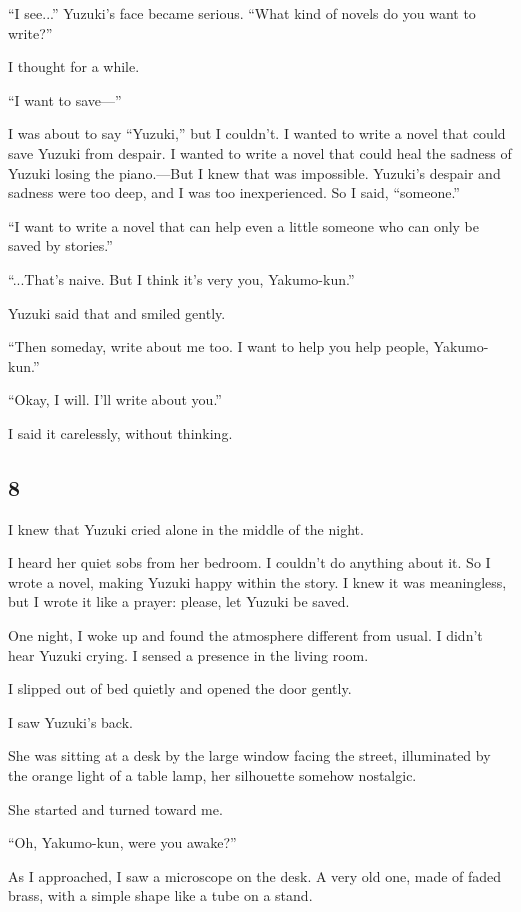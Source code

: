 \documentclass[
    a4paper,
    12pt,
    twoside,
    openany,
    UTF8,
    fontset=windows
]{ctexbook}
\begin{document}
``I see...'' Yuzuki's face became serious. ``What kind of novels do you want to write?''

I thought for a while.

``I want to save---''

I was about to say ``Yuzuki,'' but I couldn't. I wanted to write a novel that could save Yuzuki from despair. I wanted to write a novel that could heal the sadness of Yuzuki losing the piano.---But I knew that was impossible. Yuzuki's despair and sadness were too deep, and I was too inexperienced. So I said, ``someone.''

``I want to write a novel that can help even a little someone who can only be saved by stories.''

``...That's naive. But I think it's very you, Yakumo-kun.''

Yuzuki said that and smiled gently.

``Then someday, write about me too. I want to help you help people, Yakumo-kun.''

``Okay, I will. I'll write about you.''

I said it carelessly, without thinking.


\subsection*{8}

I knew that Yuzuki cried alone in the middle of the night.

I heard her quiet sobs from her bedroom. I couldn't do anything about it. So I wrote a novel, making Yuzuki happy within the story. I knew it was meaningless, but I wrote it like a prayer: please, let Yuzuki be saved.

One night, I woke up and found the atmosphere different from usual. I didn't hear Yuzuki crying. I sensed a presence in the living room.

I slipped out of bed quietly and opened the door gently.

I saw Yuzuki's back.

She was sitting at a desk by the large window facing the street, illuminated by the orange light of a table lamp, her silhouette somehow nostalgic.

She started and turned toward me.

``Oh, Yakumo-kun, were you awake?''

As I approached, I saw a microscope on the desk. A very old one, made of faded brass, with a simple shape like a tube on a stand.
\end{document}

